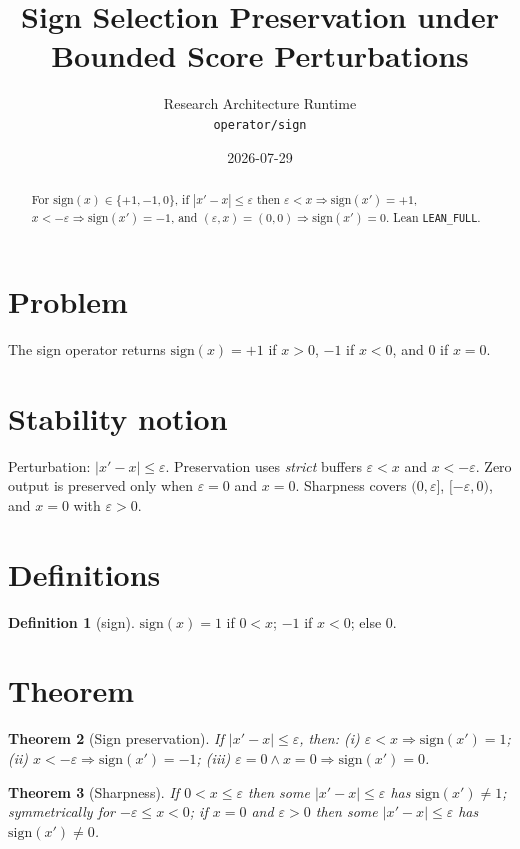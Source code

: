 \documentclass[12pt]{article}
\title{Sign Selection Preservation under Bounded Score Perturbations}
\author{Research Architecture Runtime\\[0.25em]
{\normalsize\texttt{operator/sign}}}
\date{2026-07-29}
\theoremstyle{plain}
\newtheorem{theorem}{Theorem}
\theoremstyle{definition}
\newtheorem{definition}[theorem]{Definition}
\theoremstyle{remark}
\begin{document}
\maketitle

\begin{abstract}
For $\mathrm{sign}(x)\in\{+1,-1,0\}$, if $|x'-x|\le\varepsilon$ then $\varepsilon<x\Rightarrow\mathrm{sign}(x')=+1$, $x<-\varepsilon\Rightarrow\mathrm{sign}(x')=-1$, and $(\varepsilon,x)=(0,0)\Rightarrow\mathrm{sign}(x')=0$. Lean \texttt{LEAN\_FULL}.
\end{abstract}

\noindent
\begin{center}
\end{center}
\vspace{0.6em}

\section{Problem}
{\raggedright\sloppy
The sign operator returns $\mathrm{sign}(x)=+1$ if $x>0$, $-1$ if $x<0$, and $0$ if $x=0$.
\par}

\section{Stability notion}
Perturbation: $|x'-x|\le\varepsilon$. Preservation uses \emph{strict} buffers $\varepsilon<x$ and $x<-\varepsilon$. Zero output is preserved only when $\varepsilon=0$ and $x=0$. Sharpness covers $(0,\varepsilon]$, $[-\varepsilon,0)$, and $x=0$ with $\varepsilon>0$.

\section{Definitions}
\begin{definition}[sign]
$\mathrm{sign}(x)=1$ if $0<x$; $-1$ if $x<0$; else $0$.
\end{definition}

\section{Theorem}
\begin{theorem}[Sign preservation]\label{thm:inv}
If $|x'-x|\le\varepsilon$, then: (i) $\varepsilon<x\Rightarrow\mathrm{sign}(x')=1$; (ii) $x<-\varepsilon\Rightarrow\mathrm{sign}(x')=-1$; (iii) $\varepsilon=0\land x=0\Rightarrow\mathrm{sign}(x')=0$.
\end{theorem}
\begin{theorem}[Sharpness]\label{thm:sharp}
If $0<x\le\varepsilon$ then some $|x'-x|\le\varepsilon$ has $\mathrm{sign}(x')\neq 1$; symmetrically for $-\varepsilon\le x<0$; if $x=0$ and $\varepsilon>0$ then some $|x'-x|\le\varepsilon$ has $\mathrm{sign}(x')\neq 0$.
\end{theorem}
\end{document}
